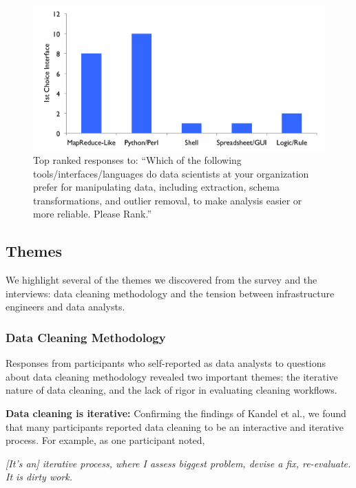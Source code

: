 \begin{figure}[t]
\centering
 \includegraphics[width=\columnwidth]{datafigs/hilda-interface.png}
 \caption{Top ranked responses to: ``Which of the following tools/interfaces/languages do data scientists at your organization prefer for manipulating data, including extraction, schema transformations, and outlier removal, to make analysis easier or more reliable. Please Rank.''\label{fig:interfaces}}
\end{figure}


\subsection{Themes}\label{sec:themes}
We highlight several of the themes we discovered from the survey and the interviews: data cleaning methodology and the tension between infrastructure engineers and data analysts.

\subsubsection{Data Cleaning Methodology}
Responses from participants who self-reported as data analysts to questions about data cleaning methodology revealed two important themes: the iterative nature of data cleaning, and the lack of rigor in evaluating cleaning workflows.

\vspace{0.5em}
\noindent\textbf{Data cleaning is iterative:}
Confirming the findings of Kandel et al., we found that many participants reported data cleaning to be an interactive and iterative process.
For example, as one participant noted,

\vspace{0.7em}
\emph{[It's an] iterative process, where I assess biggest problem, devise a fix, re-evaluate. It is dirty work.}

